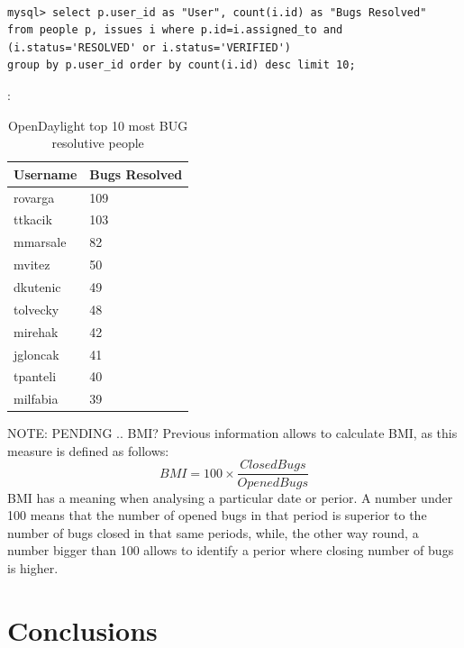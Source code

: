 \documentclass[a4paper, 12pt]{book}
\begin{document}
{\begin{verbatim}

mysql> select p.user_id as "User", count(i.id) as "Bugs Resolved"
from people p, issues i where p.id=i.assigned_to and
(i.status='RESOLVED' or i.status='VERIFIED')
group by p.user_id order by count(i.id) desc limit 10;

\end{verbatim}
:
\begin{table}[H]
\footnotesize
\begin{center}
\begin{tabular}{|p{3cm}|p{3cm}|}
\hline
\textbf{Username} & \textbf{Bugs Resolved} \\ \hline
rovarga  & 109 \\ \hline
ttkacik  & 103 \\ \hline
mmarsale & 82  \\ \hline
mvitez   & 50  \\ \hline
dkutenic & 49  \\ \hline
tolvecky & 48  \\ \hline
mirehak  & 42  \\ \hline
jgloncak & 41  \\ \hline
tpanteli & 40  \\ \hline
milfabia & 39  \\ \hline
\end{tabular}
\end{center}
\caption{OpenDaylight top 10 most BUG resolutive people}
\label{tab:odl_top_people_resolving_bugs}
\end{table}

NOTE: PENDING .. BMI?
Previous information allows to calculate BMI, as this measure is defined as follows: \[BMI = 100\times\dfrac{Closed Bugs}{Opened Bugs}\]
BMI has a meaning when analysing a particular date or perior. A number under 100 means that the number of opened bugs in that period is superior to the number of bugs closed in that same periods, while, the other way round, a number bigger than 100 allows to identify a perior where closing number of bugs is higher.

\chapter{Conclusions}
\label{chap:conclusions}


}
\end{document}
